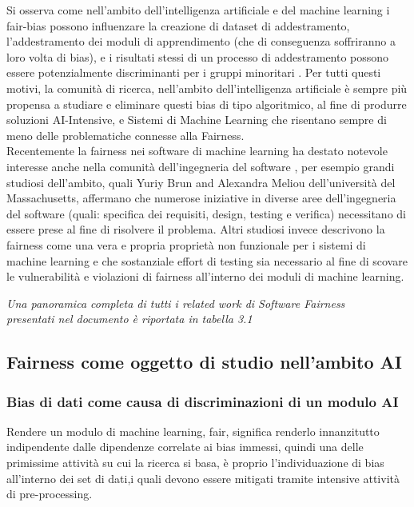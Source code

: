 Si osserva come nell'ambito dell'intelligenza artificiale e del machine learning i fair-bias possono influenzare la creazione di dataset di addestramento, l'addestramento dei moduli di apprendimento (che di conseguenza soffriranno a loro volta di bias), e i risultati stessi di un processo di addestramento possono essere potenzialmente discriminanti per i gruppi minoritari \cite{vasudevan2020lift}. Per tutti questi motivi, la comunità di ricerca, nell'ambito dell'intelligenza artificiale è sempre più propensa a studiare e eliminare questi bias di tipo algoritmico, al fine di produrre soluzioni AI-Intensive, e Sistemi di Machine Learning che risentano sempre di meno delle problematiche connesse alla Fairness.\\

Recentemente la fairness nei software di machine learning ha destato notevole interesse anche nella comunità dell'ingegneria del software \cite{Ignorance&Prejudice}, per esempio grandi studiosi dell'ambito, quali Yuriy Brun and Alexandra Meliou dell'università del Massachusetts, affermano che numerose iniziative in diverse aree dell'ingegneria del software (quali: specifica dei requisiti, design, testing e verifica) necessitano di essere prese al fine di risolvere il problema. Altri studiosi invece descrivono la fairness come una vera e propria proprietà non funzionale per i sistemi di machine learning e che sostanziale effort di testing sia necessario al fine di scovare le vulnerabilità e violazioni di fairness all'interno dei moduli di machine learning.
\begin{center}
    \emph{Una panoramica completa di tutti i related work di Software Fairness \\ presentati nel documento è riportata in tabella 3.1}
\end{center}


\subsection{Fairness come oggetto di studio nell'ambito AI}
\subsubsection{Bias di dati come causa di discriminazioni di un modulo AI}

Rendere un modulo di machine learning, fair, significa renderlo innanzitutto indipendente dalle dipendenze correlate ai bias immessi, quindi una delle primissime attività su cui la ricerca si basa, è proprio l'individuazione di bias all'interno dei set di dati,i quali devono essere mitigati tramite intensive attività di pre-processing.\\  

